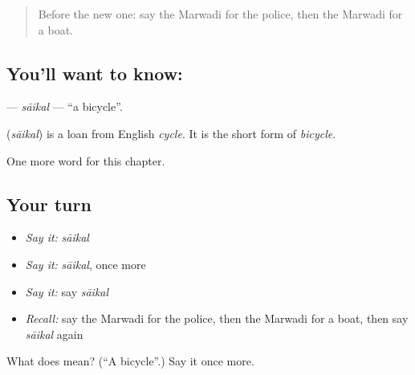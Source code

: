 \label{lesson:MW-C83-saikal}



\begin{quote}
Before the new one: say the Marwadi for the police, then the Marwadi for a boat.
\end{quote}

\subsection*{You'll want to know: }
\textbf{} — \emph{sāikal} — \textquotedblleft{}a bicycle\textquotedblright{}.

\begin{cousinweb}
\textbf{} (\emph{sāikal}) is a loan from English \emph{cycle}. It is the short form of \emph{bicycle}.
\end{cousinweb}

\begin{grammarlens}[title={What you've built}]
One more word for this chapter.
\end{grammarlens}

\subsection*{Your turn}
\begin{itemize}
\raggedright
  \item \emph{Say it:} \emph{sāikal}
  \item \emph{Say it:} \emph{sāikal}, once more
  \item \emph{Say it:} say \emph{sāikal}
  \item \emph{Recall:} say the Marwadi for the police, then the Marwadi for a boat, then say \emph{sāikal} again
\end{itemize}

\begin{tcolorbox}[breakable,colback=teal!4,colframe=teal!35!black,title={Before you move on}]
What does  mean? (\textquotedblleft{}A bicycle\textquotedblright{}.) Say it once more.
\end{tcolorbox}
